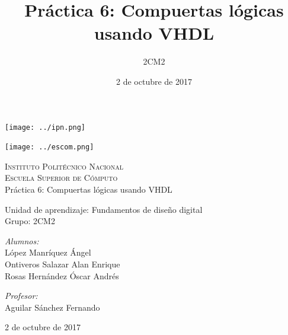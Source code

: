 \documentclass[11pt]{article}
\date{2 de octubre de 2017}
\title{Práctica 6: Compuertas lógicas usando VHDL}
\author{2CM2}
\begin{document}
		\begin{titlepage}
			\begin{center}
				
				
				\noindent
				\begin{minipage}{0.5\textwidth}
					\begin{flushleft} \large
						\texttt{[image: ../ipn.png]}
					\end{flushleft}
				\end{minipage}%
				\begin{minipage}{0.55\textwidth}
					\begin{flushright} \large
						\texttt{[image: ../escom.png]}
					\end{flushright}
				\end{minipage}
				
				\textsc{\LARGE Instituto Politécnico Nacional}\\[0.5cm]
				
				\textsc{\Large Escuela Superior de Cómputo}\\[1cm]
				
				
				{ \huge Práctica 6: Compuertas lógicas usando VHDL \\[1cm] }
				
				{ \Large Unidad de aprendizaje: Fundamentos de diseño digital} \\[1cm]
				
				{ \Large Grupo: 2CM2 } \\[1cm]
				
				\noindent
				\begin{minipage}{0.5\textwidth}
					\begin{flushleft} \large
						\emph{Alumnos:}\\
						López Manríquez Ángel\\
						Ontiveros Salazar Alan Enrique\\
						Rosas Hernández Óscar Andrés
					\end{flushleft}
				\end{minipage}%
				\begin{minipage}{0.5\textwidth}
					\begin{flushright} \large
						\emph{Profesor:} \\
						Aguilar Sánchez Fernando
					\end{flushright}
				\end{minipage}
				
				\vfill
				
				{\large 2 de octubre de 2017}
			\end{center}
		\end{titlepage}
	
\end{document}
